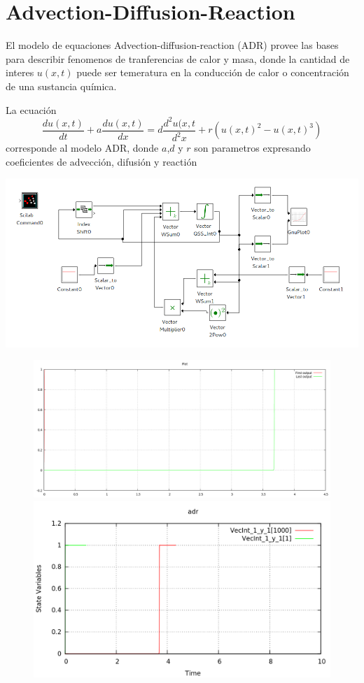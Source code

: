 \section{Advection-Diffusion-Reaction}
	El modelo de equaciones Advection-diffusion-reaction (ADR) provee las bases para describir fenomenos de tranferencias de calor y masa, donde la cantidad de interes $u(x,t)$ puede ser temeratura en la conducción de calor o concentración de una sustancia química.

La ecuación 
\begin{equation*}
\frac{du(x,t)}{dt} + a \frac{du(x,t)}{dx} = d\frac{d^2u(x,t}{d^2x} + r(u(x,t)^2 - u(x,t)^3)
\end{equation*}
corresponde al modelo ADR, donde $a$,$d$ y $r$ son parametros expresando coeficientes de advección, difusión y reactión

 \includegraphics[width=0.75\linewidth]{adr-pwd}

\begin{figure}[H]
\centering
\begin{minipage}{0.5\textwidth}
\centering
 \includegraphics[width=\linewidth]{adr-pd}
\end{minipage}\hfill
\begin{minipage}{0.5\textwidth}
\centering
 \includegraphics[width=\linewidth]{adr-qss}
\end{minipage}
\end{figure}

